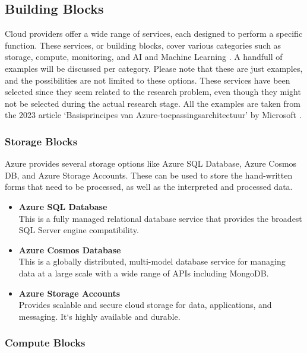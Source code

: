 \subsection{Building Blocks}

Cloud providers offer a wide range of services,
each designed to perform a specific function.
These services, or building blocks, cover various categories such as storage,
compute, monitoring, and AI and Machine Learning \cite{Microsoft2023}.
A handfull of examples will be discussed per category.
Please note that these are just examples, and the possibilities are not limited to these options.
These services have been selected since they seem related to the research problem,
even though they might not be selected during the actual research stage.
All the examples are taken from the 2023 article
`Basisprincipes van Azure-toepassingsarchitectuur' by Microsoft \cite{Microsoft2023}.

\subsubsection*{Storage Blocks}

Azure provides several storage options like Azure SQL Database,
Azure Cosmos DB, and Azure Storage Accounts.
These can be used to store the hand-written forms that need to be processed,
as well as the interpreted and processed data.

\begin{itemize}
    \item \textbf{Azure SQL Database}
    \\ This is a fully managed relational database service that provides the broadest SQL Server engine compatibility.

    \item \textbf{Azure Cosmos Database}
    \\ This is a globally distributed,
    multi-model database service for managing data at a large scale with a wide range of APIs including MongoDB.

    \item \textbf{Azure Storage Accounts}
    \\ Provides scalable and secure cloud storage for data, applications, and messaging.
    It`s highly available and durable.
\end{itemize}

\subsubsection*{Compute Blocks}

